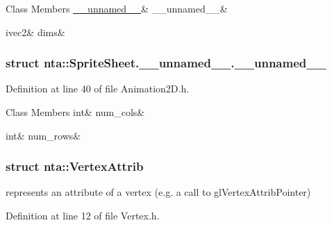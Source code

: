\begin{DoxyFields}{Class Members}
\mbox{\label{namespacenta_a1378d7d8767899287b0407055215aa4e}} 
\hyperlink{namespacenta_df/d10/structnta_1_1SpriteSheet_8____unnamed_____8____unnamed____}{\_\_unnamed\_\_}&
\_\_unnamed\_\_&
\\
\hline

\mbox{\label{namespacenta_a5927205243f12cdc70612cba6dc874fa}} 
ivec2&
dims&
\\
\hline

\end{DoxyFields}
\label{structnta_1_1SpriteSheet_8____unnamed_____8____unnamed____}
\subsubsection{struct nta\+:\+:Sprite\+Sheet.\+\_\+\+\_\+unnamed\+\_\+\+\_\+.\+\_\+\+\_\+unnamed\+\_\+\+\_\+}


Definition at line 40 of file Animation2\+D.\+h.

\begin{DoxyFields}{Class Members}
\mbox{\label{namespacenta_a2ec7686cdf35752083c4cb22b93e362e}} 
int&
num\_cols&
\\
\hline

\mbox{\label{namespacenta_ab428d91d44d86e0b79d1a3193951b762}} 
int&
num\_rows&
\\
\hline

\end{DoxyFields}
\label{structnta_1_1VertexAttrib}
\subsubsection{struct nta\+:\+:Vertex\+Attrib}
represents an attribute of a vertex (e.\+g. a call to gl\+Vertex\+Attrib\+Pointer) 

Definition at line 12 of file Vertex.\+h.



